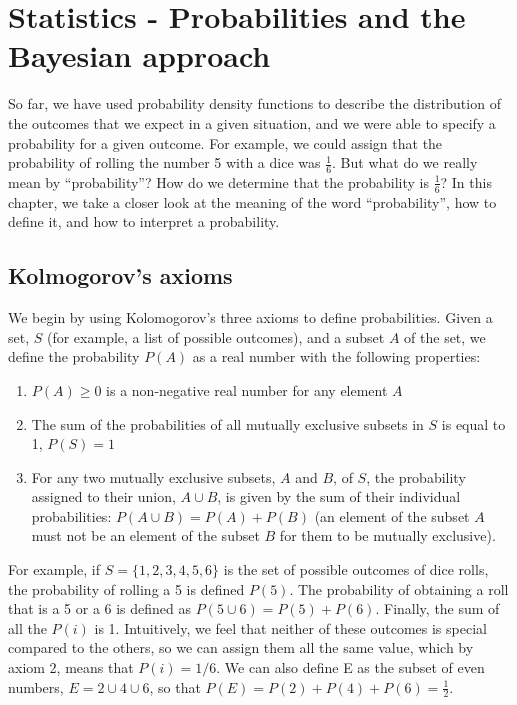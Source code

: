 %
\chapter{Statistics - Probabilities and the Bayesian approach}
\label{Chap:statProbability}
So far, we have used probability density functions to describe the distribution of the outcomes that we expect in a given situation, and we were able to specify a probability for a given outcome. For example, we could assign that the probability of rolling the number 5 with a dice was $\frac{1}{6}$. But what do we really mean by ``probability''? How do we determine that the probability is $\frac{1}{6}$? In this chapter, we take a closer look at the meaning of the word ``probability'', how to define it, and how to interpret a probability.

\section{Kolmogorov's axioms}
We begin by using Kolomogorov's three axioms to define probabilities. Given a set, $S$ (for example, a list of possible outcomes), and a subset $A$ of the set, we define the probability $P(A)$ as a real number with the following properties:
\begin{enumerate}
\item $P(A) \geq 0$ is a non-negative real number for any element $A$
\item The sum of the probabilities of all mutually exclusive subsets in $S$ is equal to 1, $P(S) = 1$
\item For any two mutually exclusive subsets, $A$ and $B$, of $S$, the probability assigned to their union, $A \cup B$, is given by the sum of their individual probabilities: $P(A \cup B) = P(A) + P(B) $ (an element of the subset $A$ must not be an element of the subset $B$ for them to be mutually exclusive). 

\end{enumerate}

For example, if $S=\{1,2,3,4,5,6\}$ is the set of possible outcomes of dice rolls, the probability of rolling a 5 is defined $P(5)$. The probability of obtaining a roll that is a 5 or a 6 is defined as $ P(5\cup 6)= P(5) + P(6)$. Finally, the sum of all the $P(i)$ is 1. Intuitively, we feel that neither of these outcomes is special compared to the others, so we can assign them all the same value, which by axiom 2, means that $P(i) = 1/6$. We can also define E as the subset of even numbers, $E = 2 \cup 4 \cup 6$, so that $P(E) = P(2) + P(4) + P(6)=\frac{1}{2}$.

